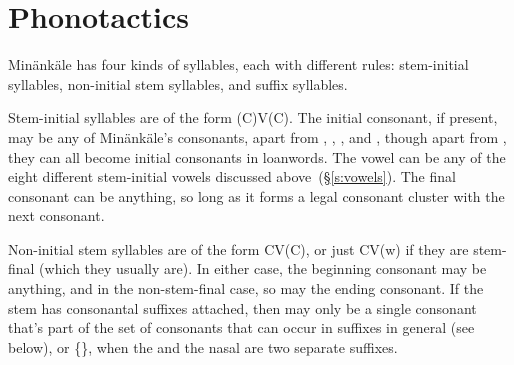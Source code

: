 \section{Phonotactics}
Min\"ank\"ale has four kinds of syllables, each with different rules:
stem-initial syllables, non-initial stem syllables, and suffix syllables.

Stem-initial syllables are of the form (C)V(C). The initial consonant, if
present, may be any of Min\"ank\"ale's consonants, apart from , ,
, and , though apart from , they can all become initial
consonants in loanwords. The vowel can be any of the eight different
stem-initial vowels discussed above~(\S\ref{s:vowels}). The final consonant can
be anything, so long as it forms a legal consonant cluster with the next
consonant.

Non-initial stem syllables are of the form CV(C), or just CV(w) if they are
stem-final (which they usually are). In either case, the beginning consonant may
be anything, and in the non-stem-final case, so may the ending consonant. If the
stem has consonantal suffixes attached, then may only be a single consonant
that's part of the set of consonants that can occur in suffixes in general (see
below), or \{\}, when the  and the nasal are two
separate suffixes.

